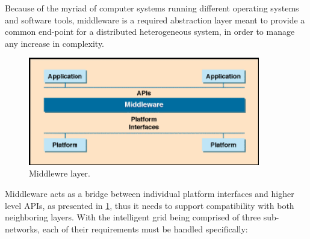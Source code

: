 \documentclass[12pt, english, a4paper]{report}
\begin{document}
Because of the myriad of computer systems running different operating systems and software tools, middleware is a required abstraction
layer meant to provide a common end-point for a distributed heterogeneous system, in order to manage any increase in complexity.

\begin{figure}[H]
	\includegraphics[width=0.9\textwidth, height=0.35\textwidth]{Pic4}
    \caption{Middlewre layer. \cite{72} \label{fig:middleware}}
\end{figure}

Middleware acts as a bridge between individual platform interfaces and higher level APIs, as presented in \cref{fig:middleware}, thus it needs
to support compatibility with both neighboring layers. With the intelligent grid being comprised of three sub-networks, each of their 
requirements must be handled specifically:
\end{document}
